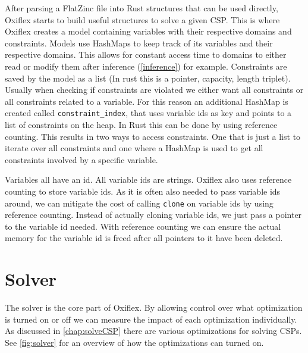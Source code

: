 After parsing a FlatZinc file into Rust structures that can be used directly, Oxiflex starts to build useful structures to solve a given CSP. This is where Oxiflex creates a model containing variables with their respective domains and constraints. Models use HashMaps to keep track of its variables and their respective domains. This allows for constant access time to domains to either read or modify them after inference (\ref{inference}) for example. Constraints are saved by the model as a list (In rust this is a pointer, capacity, length triplet). Usually when checking if constraints are violated we either want all constraints or all constraints related to a variable. For this reason an additional HashMap is created called \verb|constraint_index|, that uses variable ids as key and points to a list of constraints on the heap. In Rust this can be done by using reference counting. This results in two ways to access constraints. One that is just a list to iterate over all constraints and one where a HashMap is used to get all constraints involved by a specific variable.

Variables all have an id. All variable ids are strings. Oxiflex also uses reference counting to store variable ids. As it is often also needed to pass variable ids around, we can mitigate the cost of calling \verb|clone| on variable ids by using reference counting. Instead of actually cloning variable ids, we just pass a pointer to the variable id needed. With reference counting we can ensure the actual memory for the variable id is freed after all pointers to it have been deleted.

\section{Solver}

The solver is the core part of Oxiflex. By allowing control over what optimization is turned on or off we can measure the impact of each optimization individually. As discussed in \cref{chap:solveCSP} there are various optimizations for solving CSPs. See \cref{fig:solver} for an overview of how the optimizations can turned on. \\

